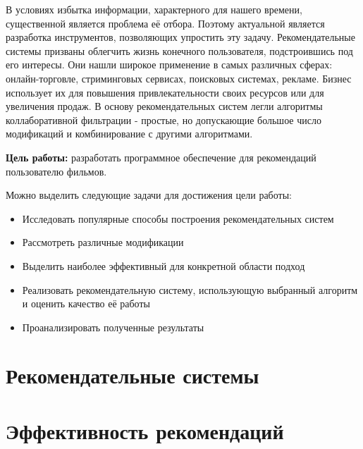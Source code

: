 \documentclass[a4paper,article,14pt]{extarticle}
\begin{document}


\tableofcontents
\pagebreak


В условиях избытка информации, характерного для нашего времени, существенной является проблема её отбора.
Поэтому актуальной является разработка инструментов, позволяющих упростить эту задачу.
Рекомендательные системы призваны облегчить жизнь конечного пользователя, подстроившись под его интересы.
Они нашли широкое применение в самых различных сферах: онлайн-торговле, стриминговых сервисах, поисковых системах, рекламе.
Бизнес использует их для повышения привлекательности своих ресурсов или для увеличения продаж.
В основу рекомендательных систем легли алгоритмы коллаборативной фильтрации - простые, но допускающие большое число модификаций и комбинирование с другими алгоритмами.


\textbf{Цель работы:} разработать программное обеспечение для рекомендаций пользователю фильмов.

Можно выделить следующие задачи для достижения цели работы:
\begin{itemize}
\item Исследовать популярные способы построения рекомендательных систем
\item Рассмотреть различные модификации
\item Выделить наиболее эффективный для конкретной области подход
\item Реализовать рекомендательную систему, использующую выбранный алгоритм и оценить качество её работы
\item Проанализировать полученные результаты

\end{itemize}
\pagebreak
\section{Рекомендательные системы}\label{sec:recommender_systems}


\pagebreak
\section{Эффективность рекомендаций}\label{sec:algos_efficiency}


\pagebreak
\end{document}
